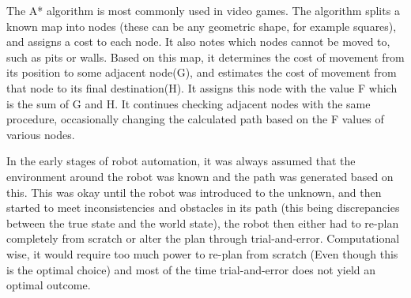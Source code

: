 The A* algorithm is most commonly used in video games. The algorithm splits a known map into nodes (these can be any geometric shape, for example squares), and assigns a cost to each node. It also notes which nodes cannot be moved to, such as pits or walls. Based on this map, it determines the cost of movement from its position to some adjacent node(G), and estimates the cost of movement from that node to its final destination(H). It assigns this node with the value F which is the sum of G and H. It continues checking adjacent nodes with the same procedure, occasionally changing the calculated path based on the F values of various nodes\cite{astar}.

In the early stages of robot automation, it was always assumed that the environment around the robot was known and the path was generated based on this. This was okay until the robot was introduced to the unknown, and then started to meet inconsistencies and obstacles in its path (this being discrepancies between the true state and the world state), the robot then either had to re-plan completely from scratch or alter the plan through trial-and-error. Computational wise, it would require too much power to re-plan from scratch (Even though this is the optimal choice) and most of the time trial-and-error does not yield an optimal outcome.

